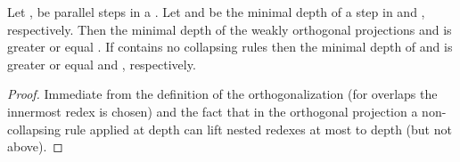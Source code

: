\begin{lemma}\label{lem:proj:lift}
  Let ,  be parallel steps in a \woTRS{} .
  Let  and  be the minimal depth of a step in  and , respectively.
  Then the minimal depth of the weakly orthogonal projections
   and 
  is greater or equal .
  If  contains no collapsing rules
  then the minimal depth of  and  is greater or equal 
  and , respectively.
\end{lemma}

\begin{proof}
  Immediate from the definition of the orthogonalization (for overlaps the innermost redex is chosen)
  and the fact that in the orthogonal projection
  a non-collapsing rule applied at depth 
  can lift nested redexes at most to depth  (but not above).
\end{proof}


